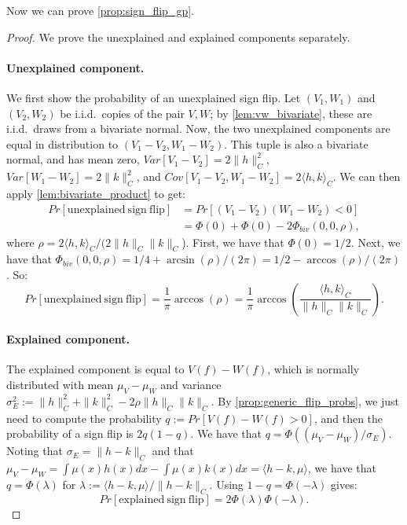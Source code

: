 Now we can prove \cref{prop:sign_flip_gp}.
\begin{proof}
We prove the unexplained and explained components separately.

	\paragraph{Unexplained component.} We first show the probability of an unexplained sign flip. 
	Let $(V_1, W_1)$ and $(V_2, W_2)$ be i.i.d.\ copies of the pair $V,W$; by \cref{lem:vw_bivariate}, these are i.i.d.\ draws from a bivariate normal.
	Now, the two unexplained components are equal in distribution to $(V_1 - V_2, W_1 - W_2)$.
	This tuple is also a bivariate normal, and has mean zero, $Var[V_1 - V_2] = 2 \| h \|^2_C$, $Var[W_1 - W_2] = 2 \| k \|_C^2$, and $Cov[V_1  - V_2, W_1 - W_2] = 2 \langle h, k \rangle_C$.
	We can then apply \cref{lem:bivariate_product} to get:
	\begin{align}
		Pr[\mathrm{unexplained\ sign\ flip}] &= Pr[ (V_1 - V_2) (W_1 - W_2) < 0] \\
		&= \Phi(0) + \Phi(0) - 2\Phi_{biv}(0,0,\rho),
	\end{align}
	where $\rho = 2\langle h,k \rangle_C / (2 \|h\|_C \|k\|_C$).
	First, we have that $\Phi(0) = 1/2$.
	Next, we have that $\Phi_{biv}(0,0,\rho) = 1/4 + \arcsin(\rho) / (2\pi) = 1/2 - \arccos(\rho) / (2\pi)$ \citep[Eq.\ (69)]{weisstein2026bivariate}.
	So:
	\begin{equation}
		Pr[\mathrm{unexplained\ sign\ flip}] = \frac{1}{\pi} \arccos(\rho) = \frac{1}{\pi} \arccos\left(\frac{\langle h, k \rangle_C}{\| h \|_C \| k \|_C} \right).
	\end{equation}
	
	\paragraph{Explained component.} The explained component is equal to $V(f) - W(f)$, which is normally distributed with mean $\mu_V - \mu_W$ and variance $\sigma_E^2 := \| h \|_C^2 + \| k \|_C^2 - 2\rho \| h \|_C \| k \|_C$. 
	By \cref{prop:generic_flip_probs}, we just need to compute the probability $q := Pr[V(f) - W(f) > 0]$, and then the probability of a sign flip is $2 q (1-q)$.
	We have that $q = \Phi((\mu_V - \mu_W) / \sigma_E)$. 
	Noting that $\sigma_E = \| h - k \|_C$ and that $\mu_V - \mu_W = \int \mu(x) h(x) dx - \int \mu(x) k(x) dx = \langle h-k, \mu \rangle$, we have that $q = \Phi(\lambda)$ for $\lambda := \langle h-k, \mu \rangle / \| h - k \|_C$.
	Using $1-q = \Phi(-\lambda)$ gives:
	\begin{equation}
		Pr[\mathrm{explained\ sign\ flip}] = 2 \Phi(\lambda) \Phi(-\lambda).
	\end{equation}
	
	

\end{proof}


